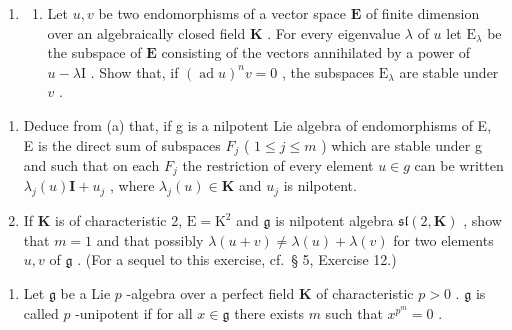 \begin{enumerate}
\def\labelenumi{\arabic{enumi}.}
\setcounter{enumi}{21}
\tightlist
\item
  \begin{enumerate}
  \def\labelenumii{(\alph{enumii})}
  \tightlist
  \item
    Let \(u, v\) be two endomorphisms of a vector space \(\mathbf{E}\) of finite dimension over an algebraically closed field \(\mathbf{K}\) . For every eigenvalue \(\lambda\) of \(u\) let \(\mathrm{E}_{\lambda}\) be the subspace of \(\mathbf{E}\) consisting of the vectors annihilated by a power of \(u - \lambda \mathrm{I}\) . Show that, if \((\operatorname{ad} u)^n v = 0\) , the subspaces \(\mathrm{E}_{\lambda}\) are stable under \(v\) .
  \end{enumerate}
\end{enumerate}

\begin{enumerate}
\def\labelenumi{(\alph{enumi})}
\setcounter{enumi}{1}
\item
  Deduce from (a) that, if g is a nilpotent Lie algebra of endomorphisms of E, E is the direct sum of subspaces \(F_{j}\) ( \(1 \leqslant j \leqslant m\) ) which are stable under g and such that on each \(F_{j}\) the restriction of every element \(u \in g\) can be written \(\lambda_{j}(u)\mathbf{I} + u_{j}\) , where \(\lambda_{j}(u) \in \mathbf{K}\) and \(u_{j}\) is nilpotent.
\item
  If \(\mathbf{K}\) is of characteristic 2, \(\mathrm{E} = \mathrm{K}^2\) and \(\mathfrak{g}\) is nilpotent algebra \(\mathfrak{sl}(2,\mathbf{K})\) , show that \(m = 1\) and that possibly \(\lambda (u + v)\neq \lambda (u) + \lambda (v)\) for two elements \(u,v\) of \(\mathfrak{g}\) . (For a sequel to this exercise, cf.~§ 5, Exercise 12.)
\end{enumerate}

\begin{enumerate}
\def\labelenumi{\arabic{enumi}.}
\setcounter{enumi}{22}
\tightlist
\item
  Let \(\mathfrak{g}\) be a Lie \(p\) -algebra over a perfect field \(\mathbf{K}\) of characteristic \(p > 0\) . \(\mathfrak{g}\) is called \(p\) -unipotent if for all \(x \in \mathfrak{g}\) there exists \(m\) such that \(x^{p^m} = 0\) .
\end{enumerate}

